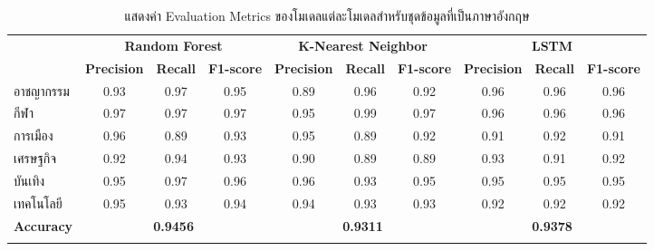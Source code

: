 \documentclass[12pt,oneside,openright,a4paper]{cpe-thai-project}
\begin{document}
\begin{itemize}
      \begin{longtable}[!ht]{lccccccccc}
        \caption{แสดงค่า Evaluation Metrics ของโมเดลแต่ละโมเดลสำหรับชุดข้อมูลที่เป็นภาษาอังกฤษ}
        \label{tbl:class_report_eng}\\
        \hhline{==========}
        \multirow{2}{*}{\textbf{หมวดหมู่}} & \multicolumn{3}{c}{\textbf{Random Forest}} & \multicolumn{3}{c}{\textbf{K-Nearest Neighbor}} & \multicolumn{3}{c}{\textbf{LSTM}}  \\
         &
          \multicolumn{1}{l}{\textbf{Precision}} &
          \multicolumn{1}{l}{\textbf{Recall}} &
          \multicolumn{1}{l}{\textbf{F1-score}} &
          \multicolumn{1}{l}{\textbf{Precision}} &
          \multicolumn{1}{l}{\textbf{Recall}} &
          \multicolumn{1}{l}{\textbf{F1-score}} &
          \multicolumn{1}{l}{\textbf{Precision}} &
          \multicolumn{1}{l}{\textbf{Recall}} &
          \multicolumn{1}{l}{\textbf{F1-score}} \\ \hline
          \endhead
          \hline
          \endfoot
          \endlastfoot
          อาชญากรรม                       &  0.93        &  0.97        &  0.95        & 0.89        & 0.96        & 0.92       & 0.96       & 0.96      & 0.96      \\
          กีฬา                             &  0.97        &  0.97        &  0.97        & 0.95        & 0.99        & 0.97       & 0.96       & 0.96      & 0.96      \\
          การเมือง                          &  0.96        &  0.89        &  0.93        & 0.95        & 0.89        & 0.92       & 0.91       & 0.92      & 0.91      \\
          เศรษฐกิจ                            &  0.92        &  0.94        &  0.93        &  0.90        & 0.89        & 0.89       & 0.93       & 0.91      & 0.92      \\
          บันเทิง                           &  0.95        &  0.97        &  0.96        & 0.96         & 0.93        & 0.95       & 0.95       & 0.95      & 0.95      \\
          เทคโนโลยี                        &  0.95        &  0.93        &  0.94        & 0.94         & 0.93        & 0.93       & 0.92       & 0.92      & 0.92      \\ \hline
          \textbf{Accuracy}               & \multicolumn{3}{c}{\textbf{0.9456}}        & \multicolumn{3}{c}{\textbf{0.9311}}     & \multicolumn{3}{c}{\textbf{0.9378}} \\ \hhline{==========}

\end{longtable}
\end{itemize}
\end{document}
